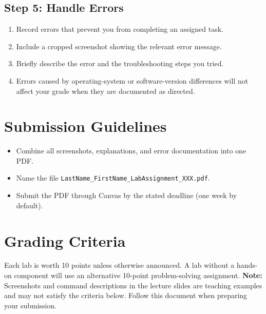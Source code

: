 \documentclass[12pt]{article}
\begin{document}
\subsection*{Step 5: Handle Errors}
\begin{enumerate}
	\item Record errors that prevent you from completing an assigned task.
	\item Include a cropped screenshot showing the relevant error message.
	\item Briefly describe the error and the troubleshooting steps you tried.
	\item Errors caused by operating-system or software-version differences
	      will not affect your grade when they are documented as directed.
\end{enumerate}

\section*{Submission Guidelines}
\begin{itemize}
	\item Combine all screenshots, explanations, and error documentation into
	      one PDF.
	\item Name the file
	      \texttt{LastName\_FirstName\_LabAssignment\_XXX.pdf}.
	\item Submit the PDF through Canvas by the stated deadline (one week by
	      default).
\end{itemize}

\section*{Grading Criteria}
Each lab is worth 10 points unless otherwise announced. A lab without a
hands-on component will use an alternative 10-point problem-solving assignment.
\textbf{Note:} Screenshots and command descriptions in the lecture slides are
teaching examples and may not satisfy the criteria below. Follow this document
when preparing your submission.
\end{document}
